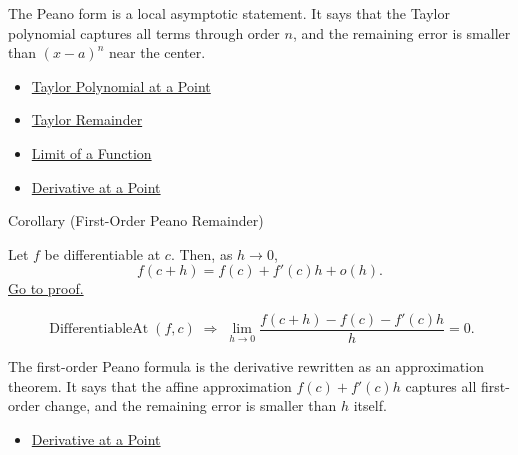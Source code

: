 \begin{remark*}[Interpretation]
The Peano form is a local asymptotic statement. It says that the Taylor
polynomial captures all terms through order $n$, and the remaining error is
smaller than $(x-a)^n$ near the center.
\end{remark*}

\begin{dependencies}
\begin{itemize}
  \item \hyperref[def:taylor-polynomial-at-a-point]{Taylor Polynomial at a Point}
  \item \hyperref[def:taylor-remainder]{Taylor Remainder}
  \item \hyperref[def:limit-function]{Limit of a Function}
  \item \hyperref[def:derivative-at-a-point]{Derivative at a Point}
\end{itemize}
\end{dependencies}


\begin{corollarybox}{Corollary (First-Order Peano Remainder)}
\begin{corollary}
\label{cor:first-order-peano-remainder}
Let $f$ be differentiable at $c$. Then, as $h\to 0$,
\[
  f(c+h)=f(c)+f'(c)h+o(h).
\]
\hyperref[prf:first-order-peano-remainder]{Go to proof.}
\end{corollary}
\end{corollarybox}

\begin{remark*}
\[
\operatorname{DifferentiableAt}(f,c)
\;\Rightarrow\;
\lim_{h\to 0}
\frac{f(c+h)-f(c)-f'(c)h}{h}
=0.
\]
\end{remark*}

\begin{remark*}[Interpretation]
The first-order Peano formula is the derivative rewritten as an approximation theorem. It says that the affine approximation $f(c)+f'(c)h$ captures all first-order change, and the remaining error is smaller than $h$ itself.
\end{remark*}

\begin{dependencies}
\begin{itemize}
  \item \hyperref[def:derivative-at-a-point]{Derivative at a Point}
\end{itemize}
\end{dependencies}

